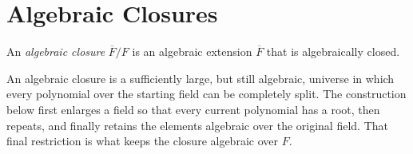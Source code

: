 \section{Algebraic Closures}
\begin{definition}
An \emph{algebraic closure} \(\overline F/F\) is an algebraic extension
\(\overline F\) that is algebraically closed.
\end{definition}

An algebraic closure is a sufficiently large, but still algebraic, universe
in which every polynomial over the starting field can be completely split.
The construction below first enlarges a field so that every current polynomial
has a root, then repeats, and finally retains the elements algebraic over the
original field.  That final restriction is what keeps the closure algebraic
over \(F\).

